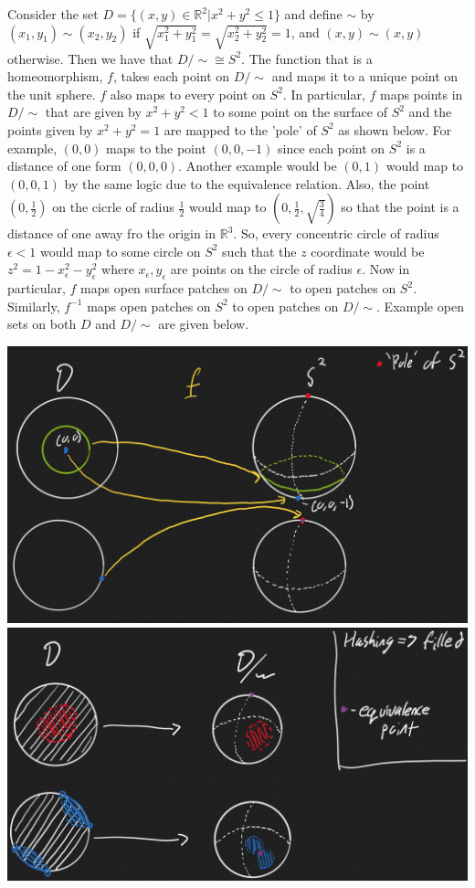 \documentclass[12pt]{article}
\begin{document}
\begin{enumerate}
Consider the set $D=\{(x,y)\in\mathbb{R}^2|x^2+y^2\leq1\}$ and define $\sim$ by $(x_1,y_1)\sim(x_2,y_2)$ if $\sqrt{x_1^2+y_1^2}=\sqrt{x_2^2+y_2^2}=1$, and $(x,y)\sim(x,y)$ otherwise. Then we have that $D/\sim\cong S^2$. The function that is a homeomorphism, $f$, takes each point on $D/\sim$ and maps it to a unique point on the unit sphere. $f$ also maps to every point on $S^2$. In particular, $f$ maps points in $D/\sim$ that are given by $x^2+y^2<1$ to some point on the surface of $S^2$ and the points given by $x^2+y^2=1$ are mapped to the 'pole' of $S^2$ as shown below. For example, $(0,0)$ maps to the point $(0,0,-1)$ since each point on $S^2$ is a distance of one form $(0,0,0)$. Another example would be $(0,1)$ would map to $(0,0,1)$ by the same logic due to the equivalence relation. Also, the point $(0,\frac12)$ on the cicrle of radius $\frac12$ would map to $(0,\frac12,\sqrt{\frac34})$ so that the point is a distance of one away fro the origin in $\mathbb{R}^3$. So, every concentric circle of radius $\epsilon<1$ would map to some circle on $S^2$ such that the $z$ coordinate would be $z^2=1-x_{\epsilon}^2-y_{\epsilon}^2$ where $x_{\epsilon},y_{\epsilon}$ are points on the circle of radius $\epsilon$. Now in particular, $f$ maps open surface patches on $D/\sim$ to open patches on $S^2$. Similarly, $f^{-1}$ maps open patches on $S^2$ to open patches on $D/\sim$. Example open sets on both $D$ and $D/\sim$ are given below.
\begin{center}
\includegraphics[scale=0.4]{ps7p222.JPG}
\includegraphics[scale=0.4]{ps7p2.JPG}
\end{center}


\end{enumerate}
\end{document}

